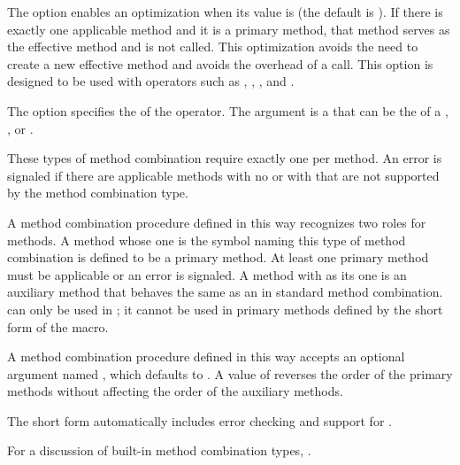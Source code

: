 \itemitem{\bull}
The  option enables an optimization
when its value is  (the default is ).  If there is
exactly one applicable method and it is a primary method, that method
serves as the effective method and  is not called.
This optimization avoids the need to create a new effective method and
avoids the overhead of a  call.  This option is designed to be
used with operators such as , , \funref{$+$}, and
.
     
\itemitem{\bull}
The  option specifies the  of the operator.  The
 argument is a  that can be the 
 of a ,
, or 
.  
 
\endlist
 
 
These types of method combination require exactly one  per
method.  An error is signaled if there are applicable methods with no
 or with  that are not supported by 
the method combination type. 
 
A method combination procedure defined in this way recognizes two
roles for methods.  A method whose one  is the symbol naming
this type of method combination is defined to be a primary method.  At
least one primary method must be applicable or an error is signaled.
A method with  as its one  is an auxiliary
method that behaves the same as an  in standard
method combination.   can only be
used in ; it cannot be used in primary methods
defined by the short form of the  macro.
 
A method combination procedure defined in this way accepts an optional
argument named , which defaults to 
.  A value of  reverses
the order of the primary methods without affecting the order of the
auxiliary methods.
 
The short form automatically includes error checking and support for
.
 
For a discussion of built-in method combination types, 
\seesection\BuiltInMethCombTypes.
 
